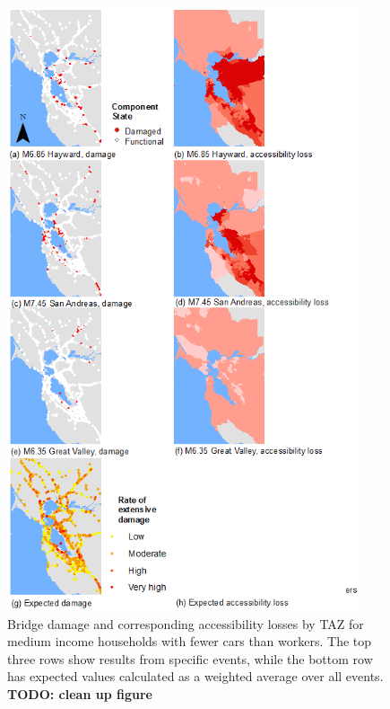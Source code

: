\begin{figure}[!htb]
    \centering
        \includegraphics[height=7in]{FIGS/accByEq.png}
    \caption{Bridge damage and corresponding accessibility losses by TAZ for medium income households with fewer cars than workers. The top three rows show results from specific events, while the bottom row has expected values calculated as a weighted average over all events. \bf{TODO: clean up figure}}
\label{fig:scen_acc}
\end{figure}


